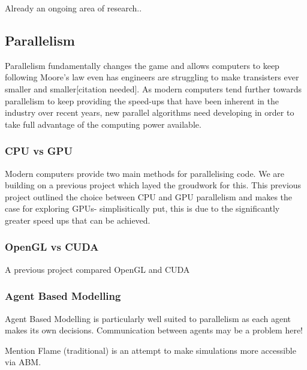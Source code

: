 \documentclass{UoYCSproject}
\begin{document}
Already an ongoing area of research.. 


\subsection{Parallelism}

Parallelism fundamentally changes the game and allows computers to keep following Moore's law even has engineers are struggling to make transisters ever smaller and smaller[citation needed]. As modern computers tend further towards parallelism to keep providing the speed-ups that have been inherent in the industry over recent years, new parallel algorithms need developing in order to take full advantage of the computing power available.

\subsubsection{CPU vs GPU}
Modern computers provide two main methods for parallelising code.
We are building on a previous project\cite{phil_diss} which layed the groudwork for this.
This previous project outlined the choice between CPU and GPU parallelism and makes the case for exploring GPUs- simplisitically put, this is due to the significantly greater speed ups that can be achieved.




\subsubsection{OpenGL vs CUDA}
A previous project compared OpenGL and CUDA


\subsubsection{Agent Based Modelling}
Agent Based Modelling is particularly well suited to parallelism as each agent makes its own decisions.
Communication between agents may be a problem here!


Mention Flame (traditional) is an attempt to make simulations more accessible via ABM.
\end{document}
